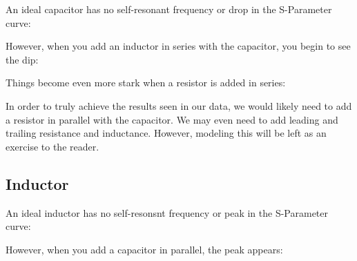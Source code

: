 \documentclass[lettersize,journal]{IEEEtran}
\begin{document}
An ideal capacitor has no self-resonant frequency or drop in the S-Parameter curve:

\begin{center}
\end{center}

However, when you add an inductor in series with the capacitor, you begin to see the dip:

\begin{center}
\end{center}

Things become even more stark when a resistor is added in series:

\begin{center}
\end{center}

In order to truly achieve the results seen in our data, we would likely need to add a resistor in parallel with the capacitor. We may even need to add leading and trailing resistance and inductance. However, modeling this will be left as an exercise to the reader.

\subsection{Inductor}

An ideal inductor has no self-resonsnt frequency or peak in the S-Parameter curve:

        \begin{center}
        \end{center}

However, when you add a capacitor in parallel, the peak appears:

        \begin{center}
        \end{center}
\end{document}
